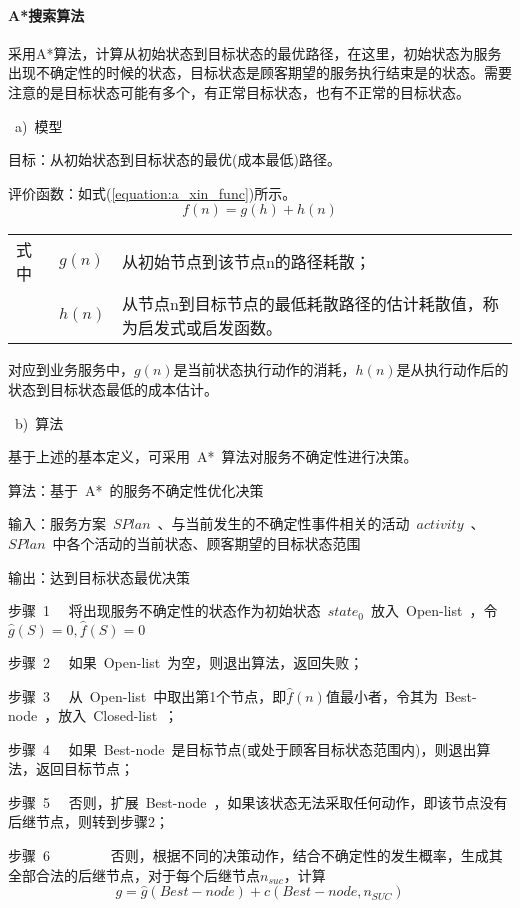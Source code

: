 \paragraph{A*搜索算法}

采用A*算法，计算从初始状态到目标状态的最优路径，在这里，初始状态为服务出现不确定性的时候的状态，目标状态是顾客期望的服务执行结束是的状态。需要注意的是目标状态可能有多个，有正常目标状态，也有不正常的目标状态。

~a)~模型

目标：从初始状态到目标状态的最优(成本最低)路径。

评价函数：如式(\ref{equation:a_xin_func})所示。
\begin{equation}\label{equation:a_xin_func}
f(n)=g(h)+h(n)
\end{equation}
\begin{tabularx}{\textwidth}{@{}l@{\quad}l@{\pozhehao }X@{}}
    式中
    & $g(n)$ & 从初始节点到该节点n的路径耗散；\\
    & $h(n)$ & 从节点n到目标节点的最低耗散路径的估计耗散值，称为启发式或启发函数。
\end{tabularx}\vspace{\wordsep}

对应到业务服务中，$g(n)$是当前状态执行动作的消耗，$h(n)$是从执行动作后的状态到目标状态最低的成本估计。

~b)~算法

基于上述的基本定义，可采用~A*~算法对服务不确定性进行决策。

算法：基于~A*~的服务不确定性优化决策

输入：服务方案~$SPlan$~、与当前发生的不确定性事件相关的活动~$activity$~、
~$SPlan$~中各个活动的当前状态、顾客期望的目标状态范围

输出：达到目标状态最优决策

步骤~1~~ 将出现服务不确定性的状态作为初始状态~$state_0$~放入~Open-list~，令$\hat g(S) = 0,\hat f(S) = 0$

步骤~2~~ 如果~Open-list~为空，则退出算法，返回失败；

步骤~3~~ 从~Open-list~中取出第1个节点，即$\hat f(n)$值最小者，令其为~Best-node~，放入~Closed-list~；

步骤~4~~ 如果~Best-node~是目标节点(或处于顾客目标状态范围内)，则退出算法，返回目标节点；

步骤~5~~ 否则，扩展~Best-node~，如果该状态无法采取任何动作，即该节点没有后继节点，则转到步骤2；

步骤~6~~~~~~~~ 否则，根据不同的决策动作，结合不确定性的发生概率，生成其全部合法的后继节点，对于每个后继节点${n_{suc}}$，计算
\[g = \hat g(Best - node) + c(Best - node,{n_{SUC}})\]

